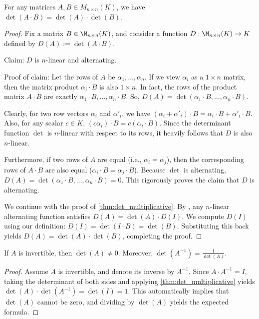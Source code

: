 \begin{theorem}
  \label{thm:det_multiplicative}
  For any matrices $A, B \in M_{n \times n}(K)$, we have $\det(A \cdot B) = \det(A) \cdot \det(B)$.
\end{theorem}

\begin{proof}
  Fix a matrix $B \in \M_{n \times n}(K)$, and consider a function $D : \M_{n \times n}(K) \to K$ defined by $D(A) := \det(A \cdot B)$.

  Claim: $D$ is $n$-linear and alternating.

  Proof of claim: Let the rows of $A$ be $\alpha_1, \dots, \alpha_n$. If we view $\alpha_i$ as a $1 \times n$ matrix, then the matrix product $\alpha_i \cdot B$ is also $1 \times n$. In fact, the rows of the product matrix $A \cdot B$ are exactly $\alpha_1 \cdot B, \dots, \alpha_n \cdot B$. So, $D(A) = \det(\alpha_1 \cdot B, \dots, \alpha_n \cdot B)$.

  Clearly, for two row vectors $\alpha_i$ and $\alpha'_i$, we have $(\alpha_i + \alpha'_i) \cdot B = \alpha_i \cdot B + \alpha'_i \cdot B$. Also, for any scalar $c \in K$, $(c\alpha_i) \cdot B = c(\alpha_i \cdot B)$. Since the determinant function $\det$ is $n$-linear with respect to its rows, it heavily follows that $D$ is also $n$-linear.

  Furthermore, if two rows of $A$ are equal (i.e., $\alpha_i = \alpha_j$), then the corresponding rows of $A \cdot B$ are also equal ($\alpha_i \cdot B = \alpha_j \cdot B$). Because $\det$ is alternating, $D(A) = \det(\alpha_1 \cdot B, \dots, \alpha_n \cdot B) = 0$. This rigorously proves the claim that $D$ is alternating.

  We continue with the proof of \cref{thm:det_multiplicative}. By , any $n$-linear alternating function satisfies $D(A) = \det(A) \cdot D(I)$. We compute $D(I)$ using our definition: $D(I) = \det(I \cdot B) = \det(B)$. Substituting this back yields $D(A) = \det(A) \cdot \det(B)$, completing the proof.
\end{proof}

\begin{corollary}
  \label{cor:det_inverse}
  If $A$ is invertible, then $\det(A) \neq 0$. Moreover, $\det(A^{-1}) = \frac{1}{\det(A)}$.
\end{corollary}

\begin{proof}
  Assume $A$ is invertible, and denote its inverse by $A^{-1}$. Since $A \cdot A^{-1} = I$, taking the determinant of both sides and applying \cref{thm:det_multiplicative} yields $\det(A) \cdot \det(A^{-1}) = \det(I) = 1$. This automatically implies that $\det(A)$ cannot be zero, and dividing by $\det(A)$ yields the expected formula.
\end{proof}

